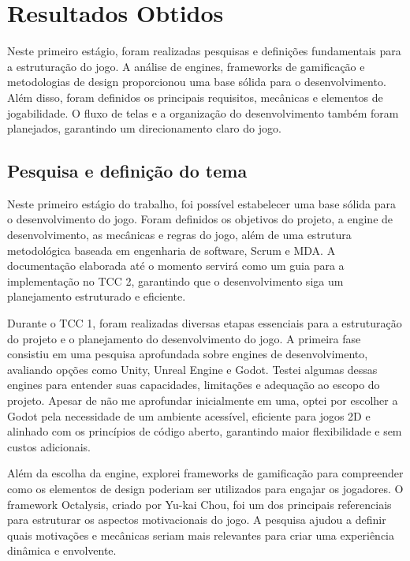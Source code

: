\chapter[Resultados Obtidos]{Resultados Obtidos}

Neste primeiro estágio, foram realizadas pesquisas e definições fundamentais para a estruturação do jogo. A análise de engines, frameworks de gamificação e metodologias de design proporcionou uma base sólida para o desenvolvimento. Além disso, foram definidos os principais requisitos, mecânicas e elementos de jogabilidade. O fluxo de telas e a organização do desenvolvimento também foram planejados, garantindo um direcionamento claro do jogo.

\section{Pesquisa e definição do tema}

Neste primeiro estágio do trabalho, foi possível estabelecer uma base sólida para o desenvolvimento do jogo. Foram definidos os objetivos do projeto, a engine de desenvolvimento, as mecânicas e regras do jogo, além de uma estrutura metodológica baseada em engenharia de software, Scrum e MDA. A documentação elaborada até o momento servirá como um guia para a implementação no TCC 2, garantindo que o desenvolvimento siga um planejamento estruturado e eficiente.

Durante o TCC 1, foram realizadas diversas etapas essenciais para a estruturação do projeto e o planejamento do desenvolvimento do jogo. A primeira fase consistiu em uma pesquisa aprofundada sobre engines de desenvolvimento, avaliando opções como Unity, Unreal Engine e Godot. Testei algumas dessas engines para entender suas capacidades, limitações e adequação ao escopo do projeto. Apesar de não me aprofundar inicialmente em uma, optei por escolher a Godot pela necessidade de um ambiente acessível, eficiente para jogos 2D e alinhado com os princípios de código aberto, garantindo maior flexibilidade e sem custos adicionais.

Além da escolha da engine, explorei frameworks de gamificação para compreender como os elementos de design poderiam ser utilizados para engajar os jogadores. O framework Octalysis, criado por Yu-kai Chou, foi um dos principais referenciais para estruturar os aspectos motivacionais do jogo. A pesquisa ajudou a definir quais motivações e mecânicas seriam mais relevantes para criar uma experiência dinâmica e envolvente.


